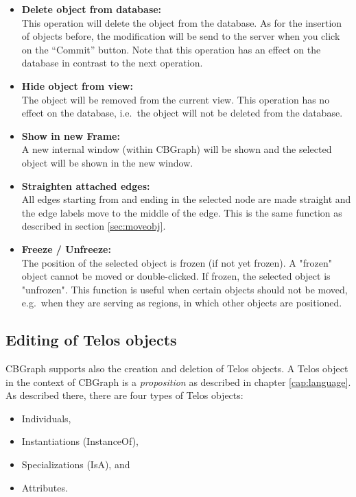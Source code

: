 \begin{itemize}
\item {\bf Delete object from database:} \\
    This operation will delete the object from the database. As for the
    insertion of objects before, the modification will be send to
    the server when you click on the ``Commit''
    button. Note that this operation has an effect on the database
    in contrast to the next operation.
\item {\bf Hide object from view:} \\
    The object will be removed from the current view. This operation
    has no effect on the database, i.e.\ the object will not be deleted
    from the database.
\item {\bf Show in new Frame:}\\
    A new internal window (within CBGraph) will be shown
    and the selected object will be shown in the new window.
\item {\bf Straighten attached edges:}\\
    All edges starting from and ending in the selected node are made straight and the edge labels move to the middle
    of the edge. This is the same function as described in section \ref{sec:moveobj}.
\item {\bf Freeze / Unfreeze:}\\
    The position of the selected object is frozen (if not yet frozen). A "frozen" object cannot be moved or double-clicked.
    If frozen, the selected object is "unfrozen".   This function is useful when certain objects should not be moved,
    e.g.\ when they are serving as regions, in which other objects are positioned.
\end{itemize}


\subsection{Editing of Telos objects}
\label{sec:graph_edit}

CBGraph supports also the creation and deletion of Telos
objects. A Telos object in the context of CBGraph
is a {\em proposition} as described in chapter \ref{cap:language}.
As described there, there are four types of Telos objects:

\begin{itemize}
\item Individuals,
\item Instantiations (InstanceOf),
\item Specializations (IsA), and
\item Attributes.
\end{itemize}

